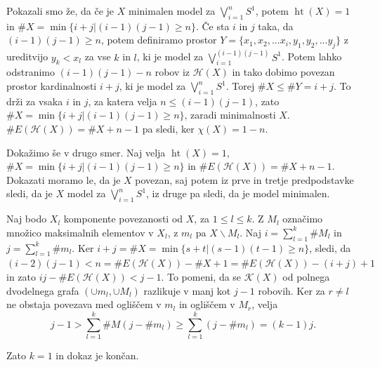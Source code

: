 \documentclass[mat1]{fmfdelo}
\DeclareRobustCommand{\h}{
    \mathcal{H}}
\DeclareMathOperator*{\htt}{ht}
\begin{document}
\begin{dokaz}
    Pokazali smo že, da če je $X$ minimalen model za $\bigvee\limits_{i=1}^{n}S^1$, potem $\htt(X)=1$ in $\#X=\min\{i+j|(i-1)(j-1)\geq n\}$. 
    Če sta $i$ in $j$ taka, da $(i-1)(j-1)\geq n$, potem definiramo prostor $Y=\{x_1,x_2,...x_i,y_1,y_2,...y_j\}$ z ureditvijo $y_k<x_l$ 
    za vse $k$ in $l$, ki je model za $\bigvee\limits_{i=1}^{(i-1)(j-1)}S^1$. Potem lahko odstranimo $(i-1)(j-1)-n$ robov iz $\h(X)$ in tako dobimo povezan prostor kardinalnosti $i+j$, ki je model za $\bigvee\limits_{i=1}^{n}S^1$. Torej $\#X\leq \#Y=i+j$. To drži za vsaka $i$ in $j$, za katera velja $n\leq (i-1)(j-1)$, zato $\#X=\min\{i+j|(i-1)(j-1)\geq n\}$, zaradi minimalnosti $X$. $\#E(\h(X))= \#X + n -1$ pa sledi, ker $\chi(X)= 1-n$.

    Dokažimo še v drugo smer. Naj velja  $\htt(X)=1$, $\#X=\min\{i+j|(i-1)(j-1)\geq n\}$ in $\#E(\h(X))= \#X + n -1.$ Dokazati moramo le, da je $X$ povezan, saj potem iz prve in tretje predpodstavke sledi, da je $X$ model za  $\bigvee\limits_{i=1}^{n}S^1$, iz druge pa sledi, da je model minimalen.

    Naj bodo $X_l$ komponente povezanosti od $X$, za $1\leq l \leq k$. Z $M_l$ označimo množico maksimalnih elementov v $X_l$, z $m_l$ pa $X\backslash M_l$. Naj $i= \sum\limits_{l=1}^k \# M_l$ in $j= \sum\limits_{l=1}^k \# m_l$. Ker $i+j=\# X =\min \{s+t|(s-1)(t-1)\geq n\}$, sledi, da $(i-2)(j-1)<n=\# E(\h(X))-\# X +1=\#E(\h(X)) -(i+j) +1$ in zato $ij -\# E(\h(X))<j-1$. To pomeni, da se $\mathcal{K}(X)$ od polnega dvodelnega grafa $(\cup m_l,\cup M_l)$
    razlikuje v manj kot $j-1$ robovih. Ker za $r\neq l$ ne obstaja povezava med ogliščem v $m_l$ in ogliščem v $M_r$, velja
    $$
        j-1>\sum\limits_{l=1}^{k}\# M(j- \# m_l)\geq \sum\limits_{l=1}^{k}(j- \# m_l)=(k-1)j.
    $$

    Zato $k=1$ in dokaz je končan.
\end{dokaz}
\end{document}
